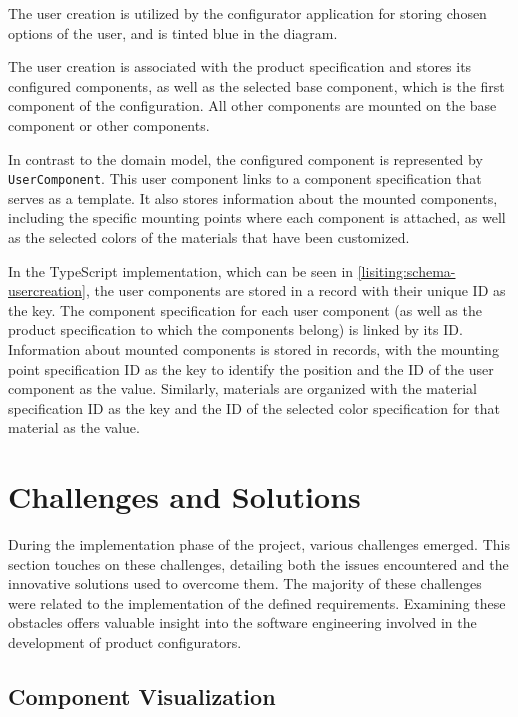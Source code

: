 The user creation is utilized by the configurator application for storing chosen options of the user, and is tinted blue in the  diagram.

The user creation is associated with the product specification and stores its configured components, as well as the selected base component, which is the first component of the configuration. All other components are mounted on the base component or other components.

In contrast to the domain model, the configured component is represented by \texttt{UserComponent}. This user component links to a component specification that serves as a template. It also stores information about the mounted components, including the specific mounting points where each component is attached, as well as the selected colors of the materials that have been customized.

In the TypeScript implementation, which can be seen in \autoref{lisiting:schema-usercreation}, the user components are stored in a record with their unique ID as the key. The component specification for each user component (as well as the product specification to which the components belong) is linked by its ID. Information about mounted components is stored in records, with the mounting point specification ID as the key to identify the position and the ID of the user component as the value. Similarly, materials are organized with the material specification ID as the key and the ID of the selected color specification for that material as the value.


\section{Challenges and Solutions}

During the implementation phase of the project, various challenges emerged. This section touches on these challenges, detailing both the issues encountered and the innovative solutions used to overcome them. The majority of these challenges were related to the implementation of the defined requirements. Examining these obstacles offers valuable insight into the software engineering involved in the development of product configurators.


\subsection{Component Visualization}

